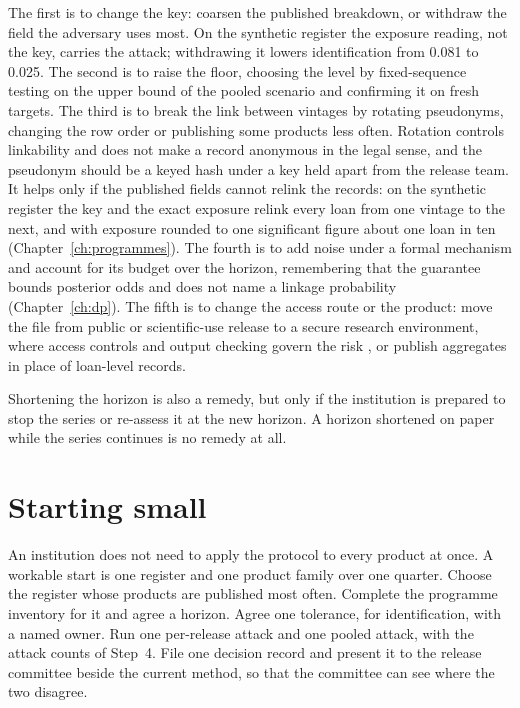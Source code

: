 The first is to change the key: coarsen the published breakdown, or withdraw the
field the adversary uses most. On the synthetic register the exposure reading, not
the key, carries the attack; withdrawing it lowers identification from 0.081 to
0.025. %
The second is to raise the floor, choosing the level by fixed-sequence testing on the
upper bound of the pooled scenario and confirming it on fresh targets. The third is to
break the link between vintages by rotating pseudonyms, changing the row order or
publishing some products less often. Rotation controls linkability and does not make
a record anonymous in the legal sense, and the pseudonym should be a keyed hash under
a key held apart from the release team. It helps only if the published fields cannot
relink the records: on the synthetic register the key and the exact exposure relink
every loan from one vintage to the next, and with exposure rounded to one significant
figure about one loan in ten (Chapter~\ref{ch:programmes}). The fourth is to add noise
under a formal mechanism and account for its budget over the horizon, remembering
that the guarantee bounds posterior odds and does not name a linkage probability
(Chapter~\ref{ch:dp}). The fifth is to change the access route or the product: move
the file from public or scientific-use release to a secure research environment,
where access controls and output checking govern the risk \citep{desai2016}, or
publish aggregates in place of loan-level records.

Shortening the horizon is also a remedy, but only if the institution is prepared to
stop the series or re-assess it at the new horizon. A horizon shortened on paper
while the series continues is no remedy at all.

\section{Starting small}

An institution does not need to apply the protocol to every product at once. A
workable start is one register and one product family over one quarter. Choose the
register whose products are published most often. Complete the programme inventory
for it and agree a horizon. Agree one tolerance, for identification, with a named
owner. Run one per-release attack and one pooled attack, with the attack counts of
Step~4. File one decision record and present it to the release committee beside the
current method, so that the committee can see where the two disagree.

